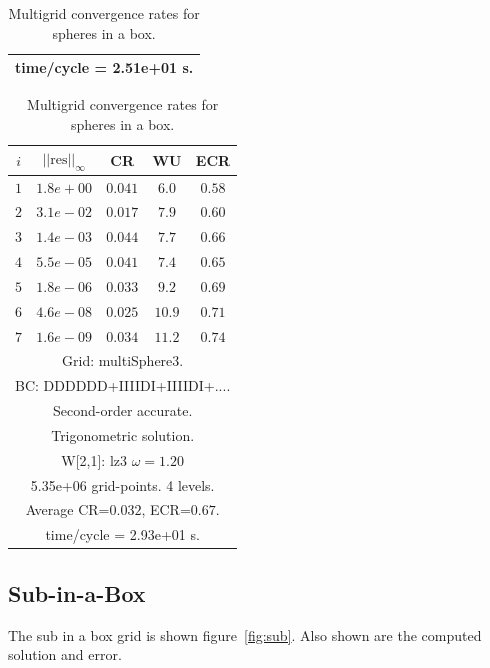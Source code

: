 \begin{table}[hbt]
\begin{center}
{\begin{tabular}{|c|c|c|c|c|}
\multicolumn{5}{|c|}{time/cycle = 2.51e+01 s.}  \\
\hline 
\end{tabular}
\begin{tabular}{|c|c|c|c|c|} \hline 
 $i$   & $\vert\vert\mbox{res}\vert\vert_\infty$  &  CR     &  WU    & ECR  \\   \hline 
 $ 1$  & $ 1.8e+00$ & $0.041$ & $ 6.0$ & $0.58$ \\ 
 $ 2$  & $ 3.1e-02$ & $0.017$ & $ 7.9$ & $0.60$ \\ 
 $ 3$  & $ 1.4e-03$ & $0.044$ & $ 7.7$ & $0.66$ \\ 
 $ 4$  & $ 5.5e-05$ & $0.041$ & $ 7.4$ & $0.65$ \\ 
 $ 5$  & $ 1.8e-06$ & $0.033$ & $ 9.2$ & $0.69$ \\ 
 $ 6$  & $ 4.6e-08$ & $0.025$ & $10.9$ & $0.71$ \\ 
 $ 7$  & $ 1.6e-09$ & $0.034$ & $11.2$ & $0.74$ \\ 
\hline 
\multicolumn{5}{|c|}{Grid: multiSphere3.}  \\
\multicolumn{5}{|c|}{BC: DDDDDD+IIIIDI+IIIIDI+....}  \\
\multicolumn{5}{|c|}{Second-order accurate.}  \\
\multicolumn{5}{|c|}{Trigonometric solution.}  \\
\multicolumn{5}{|c|}{W[2,1]: lz3 $\omega=1.20$}  \\
\multicolumn{5}{|c|}{5.35e+06 grid-points. 4 levels.}  \\
\multicolumn{5}{|c|}{Average CR=$0.032$, ECR=$0.67$.}  \\
\multicolumn{5}{|c|}{time/cycle = 2.93e+01 s.}  \\
\hline 
\end{tabular}
} %
\end{center}
\caption{Multigrid convergence rates for spheres in a box.}
\label{fig:multiSphereII}
\end{table}






\clearpage
\subsection{Sub-in-a-Box}

  The sub in a box grid is shown figure~\ref{fig:sub}. Also shown are the computed
solution and error.

